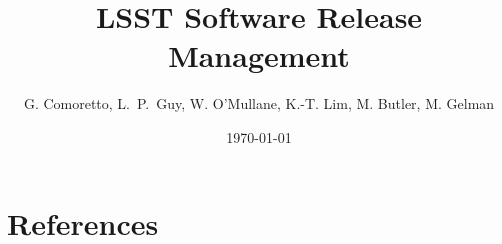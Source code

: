 \documentclass[DM,lsstdraft,toc]{lsstdoc}
\title{LSST Software Release Management}
\author{%
G. Comoretto, L.~P.~Guy, W. O'Mullane, K.-T. Lim, M. Butler, M. Gelman
}
\date{\today}
\begin{document}
\maketitle



\newpage


\newpage


\newpage


\newpage
\appendix

\section{References} \label{sec:bib}


\printglossaries
\end{document}
